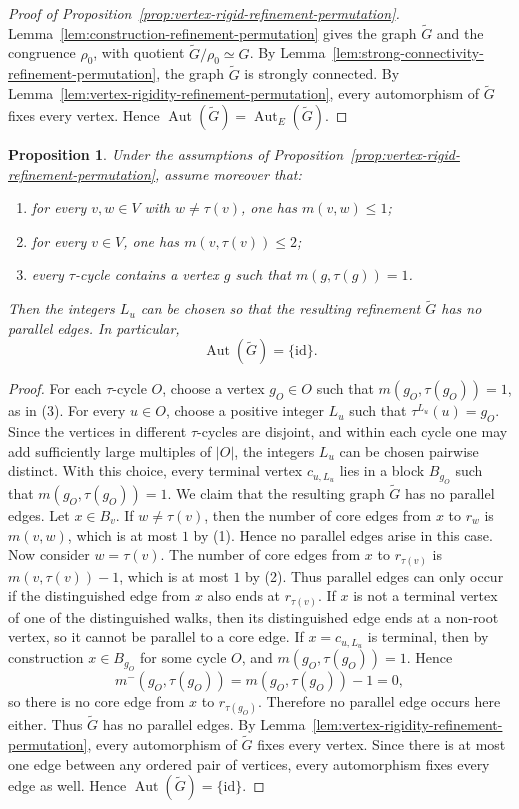 \documentclass[a4paper,10pt]{amsart}
\theoremstyle{plain}
\newtheorem{proposition}[theorem]{Proposition}
\theoremstyle{definition}
\DeclareMathOperator{\Aut}{Aut}
\newcommand{\id}{\mathrm{id}}
\begin{document}
\begin{proof}[Proof of Proposition~\ref{prop:vertex-rigid-refinement-permutation}]
Lemma~\ref{lem:construction-refinement-permutation} gives the graph $\widetilde G$ and the congruence $\rho_0$, with quotient $\widetilde G/\rho_0\simeq G$. By Lemma~\ref{lem:strong-connectivity-refinement-permutation}, the graph $\widetilde G$ is strongly connected. By Lemma~\ref{lem:vertex-rigidity-refinement-permutation}, every automorphism of $\widetilde G$ fixes every vertex. Hence $\Aut(\widetilde G)=\Aut_E(\widetilde G)$.
\end{proof}

\begin{proposition}\label{prop:parallel-free-rigidification}
Under the assumptions of Proposition~\ref{prop:vertex-rigid-refinement-permutation}, assume moreover that:
\begin{enumerate}
\item for every $v,w\in V$ with $w\neq \tau(v)$, one has $m(v,w)\le 1$;
\item for every $v\in V$, one has $m(v,\tau(v))\le 2$;
\item every $\tau$-cycle contains a vertex $g$ such that $m(g,\tau(g))=1$.
\end{enumerate}
Then the integers $L_u$ can be chosen so that the resulting refinement $\widetilde G$ has no parallel edges. In particular,
\[
\Aut(\widetilde G)=\{\id\}.
\]
\end{proposition}

\begin{proof}
For each $\tau$-cycle $O$, choose a vertex $g_O\in O$ such that $m(g_O,\tau(g_O))=1$, as in (3). For every $u\in O$, choose a positive integer $L_u$ such that $\tau^{L_u}(u)=g_O$. Since the vertices in different $\tau$-cycles are disjoint, and within each cycle one may add sufficiently large multiples of $|O|$, the integers $L_u$ can be chosen pairwise distinct.
With this choice, every terminal vertex $c_{u,L_u}$ lies in a block $B_{g_O}$ such that $m(g_O,\tau(g_O))=1$.
We claim that the resulting graph $\widetilde G$ has no parallel edges. Let $x\in B_v$.
If $w\neq \tau(v)$, then the number of core edges from $x$ to $r_w$ is $m(v,w)$, which is at most $1$ by (1). Hence no parallel edges arise in this case.
Now consider $w=\tau(v)$. The number of core edges from $x$ to $r_{\tau(v)}$ is $m(v,\tau(v))-1$, which is at most $1$ by (2). Thus parallel edges can only occur if the distinguished edge from $x$ also ends at $r_{\tau(v)}$. If $x$ is not a terminal vertex of one of the distinguished walks, then its distinguished edge ends at a non-root vertex, so it cannot be parallel to a core edge. If $x=c_{u,L_u}$ is terminal, then by construction $x\in B_{g_O}$ for some cycle $O$, and $m(g_O,\tau(g_O))=1$. Hence
\[
m^-(g_O,\tau(g_O))=m(g_O,\tau(g_O))-1=0,
\]
so there is no core edge from $x$ to $r_{\tau(g_O)}$. Therefore no parallel edge occurs here either.
Thus $\widetilde G$ has no parallel edges. By Lemma~\ref{lem:vertex-rigidity-refinement-permutation}, every automorphism of $\widetilde G$ fixes every vertex. Since there is at most one edge between any ordered pair of vertices, every automorphism fixes every edge as well. Hence $\Aut(\widetilde G)=\{\id\}$.
\end{proof}
\end{document}
